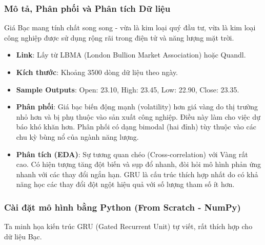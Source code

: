 \subsubsection{Mô tả, Phân phối và Phân tích Dữ liệu}
Giá Bạc mang tính chất song song - vừa là kim loại quý đầu tư, vừa là kim loại công nghiệp được sử dụng rộng rãi trong điện tử và năng lượng mặt trời.
\begin{itemize}
    \item \textbf{Link}: Lấy từ LBMA (London Bullion Market Association) hoặc Quandl.
    \item \textbf{Kích thước}: Khoảng 3500 dòng dữ liệu theo ngày.
    \item \textbf{Sample Outputs}: Open: 23.10, High: 23.45, Low: 22.90, Close: 23.35.
    \item \textbf{Phân phối}: Giá bạc biến động mạnh (volatility) hơn giá vàng do thị trường nhỏ hơn và bị phụ thuộc vào sản xuất công nghiệp. Điều này làm cho việc dự báo khó khăn hơn. Phân phối có dạng bimodal (hai đỉnh) tùy thuộc vào các chu kỳ bùng nổ của ngành năng lượng.
    \item \textbf{Phân tích (EDA)}: Sự tương quan chéo (Cross-correlation) với Vàng rất cao. Có hiện tượng tăng đột biến và sụp đổ nhanh, đòi hỏi mô hình phản ứng nhanh với các thay đổi ngắn hạn. GRU là cấu trúc thích hợp nhất do có khả năng học các thay đổi đột ngột hiệu quả với số lượng tham số ít hơn.
\end{itemize}

\subsubsection{Cài đặt mô hình bằng Python (From Scratch - NumPy)}
Ta minh họa kiến trúc GRU (Gated Recurrent Unit) tự viết, rất thích hợp cho dữ liệu Bạc.

